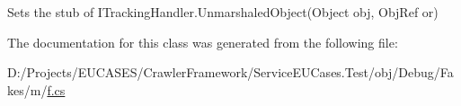 Sets the stub of I\-Tracking\-Handler.\-Unmarshaled\-Object(\-Object obj, Obj\-Ref or)



The documentation for this class was generated from the following file\-:\begin{DoxyCompactItemize}
\item 
D\-:/\-Projects/\-E\-U\-C\-A\-S\-E\-S/\-Crawler\-Framework/\-Service\-E\-U\-Cases.\-Test/obj/\-Debug/\-Fakes/m/\hyperlink{m_2f_8cs}{f.\-cs}\end{DoxyCompactItemize}
